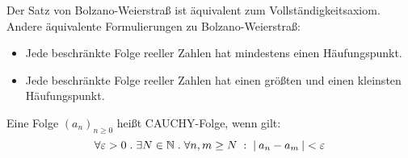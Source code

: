 \documentclass[a4paper,titlepage,oneside]{article}
\def\N{\ensuremath{\mathbb{N}} }
\renewcommand{\epsilon}{\ensuremath{\varepsilon} }
\def\sp{\hspace{0,1cm}}
\def\spdot{\sp.\sp}
\def\spcolon{\sp:\sp}
\newcommand{\abs}[1]{\ensuremath{\left|\:#1\:\right|}}
\theoremstyle{thmstyle}
\begin{document}
\begin{subbem}
Der Satz von Bolzano-Weierstraß ist äquivalent zum Vollständigkeitsaxiom. Andere äquivalente Formulierungen zu Bolzano-Weierstraß:
\begin{itemize}
\item Jede beschränkte Folge reeller Zahlen hat mindestens einen Häufungspunkt.
\item Jede beschränkte Folge reeller Zahlen hat einen größten und einen kleinsten Häufungspunkt.
\end{itemize}
\end{subbem}

\begin{subdefi}
Eine Folge \((a_n)_{n \ge 0}\) heißt CAUCHY-Folge, wenn gilt:
\[\forall \epsilon > 0 \spdot \exists N \in \N \spdot \forall n, m \ge N \spcolon \abs{a_n - a_m} < \epsilon\]
\end{subdefi}
\end{document}
